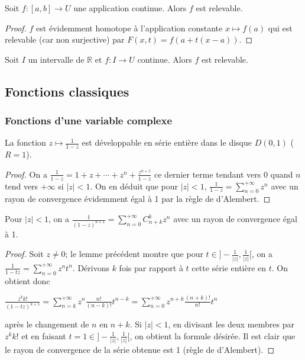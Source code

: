 \begin{thm}
Soit $f : [a,b] \rightarrow U$ une application continue. Alors $f$ est relevable.
\end{thm}

\begin{proof}
$f$ est évidemment homotope à l'application constante $x \mapsto f(a)$ qui est relevable (car non surjective) par $F(x,t) = f(a + t(x - a))$.
\end{proof}

\begin{thm}
Soit $I$ un intervalle de $\mathbb{R}$ et $f : I \rightarrow U$ continue. Alors $f$ est relevable.
\end{thm}

\subsection{Fonctions classiques}

\subsubsection{Fonctions d'une variable complexe}

\begin{lem}
La fonction $z \mapsto \frac{1}{1-z}$ est développable en série entière dans le disque $D(0,1)$ ($R = 1$).
\end{lem}

\begin{proof}
On a $\frac{1}{1-z} = 1 + z + \cdots + z^n + \frac{z^{n+1}}{1-z}$ ce dernier terme tendant vers 0 quand $n$ tend vers $+\infty$ si $|z| < 1$. On en déduit que pour $|z| < 1$, $\frac{1}{1-z} = \sum_{n=0}^{+\infty} z^n$ avec un rayon de convergence évidemment égal à 1 par la règle de d'Alembert.
\end{proof}

\begin{prop}
Pour $|z| < 1$, on a $\frac{1}{(1-z)^{k+1}} = \sum_{n=0}^{+\infty} C_{n+k}^k z^n$ avec un rayon de convergence égal à 1.
\end{prop}

\begin{proof}
Soit $z \neq 0$; le lemme précédent montre que pour $t \in ]-\frac{1}{|z|}, \frac{1}{|z|}[$, on a $\frac{1}{1-tz} = \sum_{n=0}^{+\infty} z^n t^n$. Dérivons $k$ fois par rapport à $t$ cette série entière en $t$. On obtient donc

$\frac{z^k k!}{(1-tz)^{k+1}} = \sum_{n=k}^{+\infty} z^n \frac{n!}{(n-k)!} t^{n-k} = \sum_{n=0}^{+\infty} z^{n+k} \frac{(n+k)!}{n!} t^n$

après le changement de $n$ en $n+k$. Si $|z| < 1$, en divisant les deux membres par $z^k k!$ et en faisant $t = 1 \in ]-\frac{1}{|z|}, \frac{1}{|z|}[$, on obtient la formule désirée. Il est clair que le rayon de convergence de la série obtenue est 1 (règle de d'Alembert).
\end{proof}

